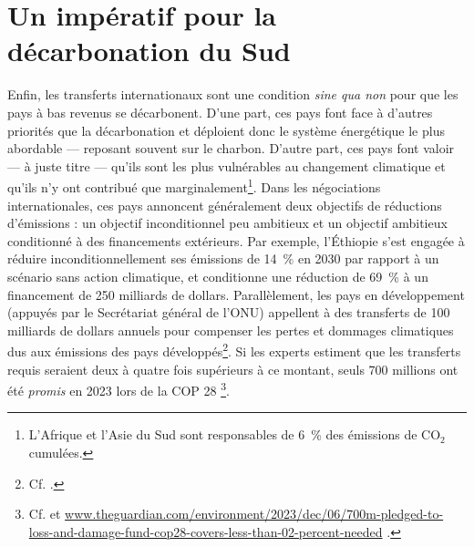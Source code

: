 \documentclass[a5paper,french,openany]{memoir}
\begin{document}
\section{Un impératif pour la décarbonation du Sud}
Enfin, les transferts internationaux sont une condition \textit{sine qua non} pour que les pays à bas revenus se décarbonent. D'une part, ces pays font face à d'autres priorités que la décarbonation et déploient donc le système énergétique le plus abordable --- reposant souvent sur le charbon. D'autre part, ces pays font valoir --- à juste titre --- qu'ils sont les plus vulnérables au changement climatique et qu'ils n'y ont contribué que marginalement\footnote{L'Afrique et l'Asie du Sud sont responsables de 6~\% des émissions de CO$_\text{2}$ cumulées. %
}. Dans les négociations internationales, ces pays annoncent généralement deux objectifs de réductions d'émissions : un objectif inconditionnel peu ambitieux et un objectif ambitieux conditionné à des financements extérieurs. Par exemple, l'Éthiopie s'est engagée à réduire inconditionnellement ses émissions de 14~\% en 2030 par rapport à un scénario sans action climatique, et conditionne une réduction de 69~\% à un financement de 250 milliards de dollars. %
Parallèlement, les pays en développement (appuyés par le Secrétariat général de l'ONU) appellent à des transferts de 100 milliards de dollars annuels pour compenser les pertes et dommages climatiques dus aux émissions des pays développés\footnote{Cf. \cite{tc_proposal_2023,sgnu_bridgetown_2023}.}. Si les experts estiment que les transferts requis seraient deux à quatre fois supérieurs à ce montant, seuls 700 millions ont été \textit{promis} en 2023 lors de la COP 28%
\footnote{Cf. \cite{songwe_climate_2023,markandya_integrated_2019,robinson_valuing_2021} et \href{https://www.theguardian.com/environment/2023/dec/06/700m-pledged-to-loss-and-damage-fund-cop28-covers-less-than-02-percent-needed}{www.theguardian.com/environment/2023/dec/06/700m-pledged-to-loss-and-damage-fund-cop28-covers-less-than-02-percent-needed}%
.}.
\end{document}
